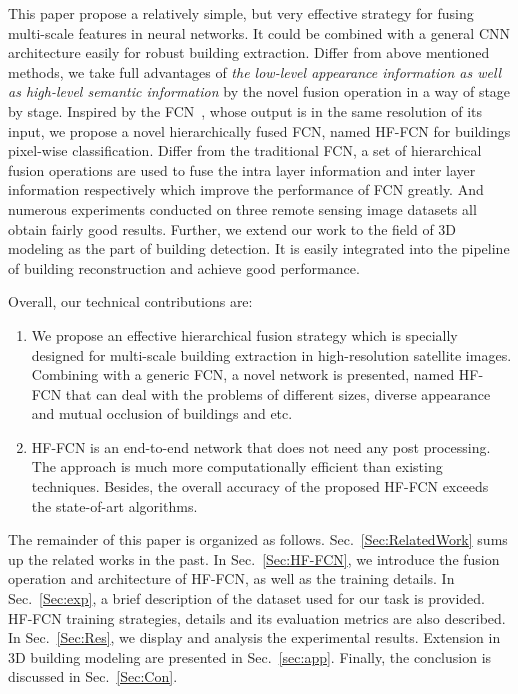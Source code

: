 This paper propose a relatively simple, but very effective strategy for fusing 
multi-scale features in neural networks. 
It could be combined with a general CNN architecture easily for robust building extraction. 
Differ from above mentioned methods, we take full advantages of \emph{the low-level appearance information as well as high-level semantic information} by the novel fusion operation in a way of stage by stage.
Inspired by the FCN~\cite{IEEEexample:Long_2015_CVPR}, whose output is in the same resolution of its input, we propose a novel hierarchically fused FCN, named HF-FCN for buildings pixel-wise classification.
Differ from the traditional FCN, a set of hierarchical fusion operations are used to fuse the intra layer information and inter layer information respectively which improve the performance of FCN greatly.
And numerous experiments conducted on three remote sensing image datasets all obtain fairly good results.
Further, we extend our work to the field of 3D modeling as the part of building detection. 
It is easily integrated into the pipeline of building reconstruction and achieve good performance. 

Overall, our technical contributions are:
%
\begin{enumerate}
	\item We propose an effective hierarchical fusion strategy which is specially designed for multi-scale building extraction in high-resolution satellite images. Combining with a generic FCN, a novel network is presented, named HF-FCN that can deal with the problems of different sizes, diverse appearance and mutual occlusion of buildings and etc.
	\item HF-FCN is an end-to-end network that does not need any post processing. The approach is much more computationally efficient than existing techniques. Besides, the overall accuracy of the proposed HF-FCN exceeds the state-of-art algorithms.
\end{enumerate}

The remainder of this paper is organized as follows. Sec.~\ref{Sec:RelatedWork} sums up the related works in the past.
In Sec.~\ref{Sec:HF-FCN}, we introduce the fusion operation and architecture of HF-FCN, as well as the training details.
In Sec.~\ref{Sec:exp}, a brief description of the dataset used for our task is provided. HF-FCN training strategies, details and its evaluation metrics are also described.
In Sec.~\ref{Sec:Res}, we display and analysis the experimental results.
Extension in 3D building modeling are presented in Sec.~\ref{sec:app}.
Finally, the conclusion is discussed in Sec.~\ref{Sec:Con}.
